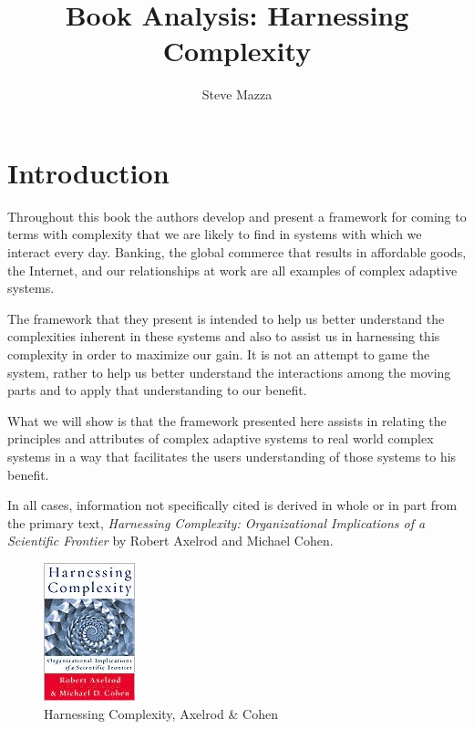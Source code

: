\documentclass[jou,apacite]{apa6}
\title{Book Analysis: Harnessing Complexity}
\author{Steve Mazza}
\affiliation{Naval Postgraduate School}
\begin{document}
\maketitle    
                        
\section{Introduction}
Throughout this book the authors develop and present a framework for coming to terms with complexity that we are likely to find in systems with which we interact every day.  Banking, the global commerce that results in affordable goods, the Internet, and our relationships at work are all examples of complex adaptive systems.

The framework that they present is intended to help us better understand the complexities inherent in these systems and also to assist us in harnessing this complexity in order to maximize our gain.  It is not an attempt to game the system, rather to help us better understand the interactions among the moving parts and to apply that understanding to our benefit.

What we will show is that the framework presented here assists in relating the principles and attributes of complex adaptive systems to real world complex systems in a way that facilitates the users understanding of those systems to his benefit.

In all cases, information not specifically cited is derived in whole or in part from the primary text, \emph{Harnessing Complexity: Organizational Implications of a Scientific Frontier} by Robert Axelrod and Michael Cohen.

\begin{figure}[htpb]
  \centering
  \includegraphics[width=0.35\columnwidth]{images/harnessingComplexity.jpg}
  \caption{Harnessing Complexity, Axelrod \& Cohen}
  \label{fig:hc}
\end{figure}
\end{document}
